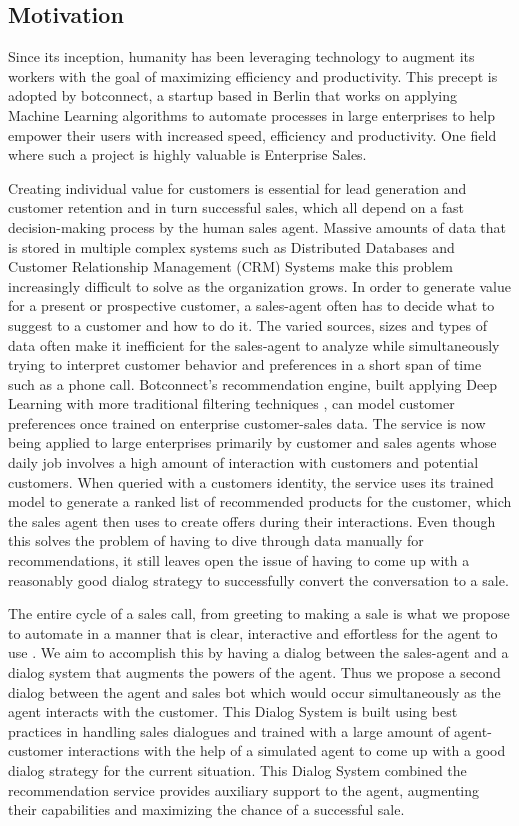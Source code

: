 \documentclass[12pt]{extarticle}
\numberwithin{equation}{section}
\begin{document}
	\subsection{Motivation}
	Since its inception, humanity has been leveraging technology to augment its workers with the goal of maximizing efficiency and productivity. This precept is adopted by botconnect, a startup based in Berlin that works on applying Machine Learning algorithms to automate processes in large enterprises to help empower their users with increased speed, efficiency and productivity. One field where such a project is highly valuable is Enterprise Sales. \par
	Creating individual value for customers is essential for lead generation and customer retention and in turn successful sales, which all depend on a fast decision-making process by the human sales agent. Massive amounts of data that is stored in multiple complex systems such as Distributed Databases and Customer Relationship Management (CRM) Systems make this problem increasingly difficult to solve as the organization grows. In order to generate value for a present or prospective customer, a sales-agent often has to decide what to suggest to a customer and how to do it. The varied sources, sizes and types of data often make it inefficient for the sales-agent to analyze while simultaneously trying to interpret customer behavior and preferences in a short span of time such as a phone call. Botconnect's recommendation engine, built applying Deep Learning with more traditional filtering techniques \cite{ncf2017}, can model customer preferences once trained on enterprise customer-sales data. The service is now being applied to large enterprises primarily by customer and sales agents whose daily job involves a high amount of interaction with customers and potential customers. \label{plag1} When queried with a customers identity, the service uses its trained model to generate a ranked list of recommended products for the customer, which the sales agent then uses to create offers during their interactions. Even though this solves the problem of having to dive through data manually for recommendations, it still leaves open the issue of having to come up with a reasonably good dialog strategy to successfully convert the conversation to a sale.\par  \label{plag10} 
	The entire cycle of a sales call, from greeting to making a sale is what we propose to automate in a manner that is clear, interactive and effortless for the agent to use \cite{frey2017future}. We aim to accomplish this by having a dialog \cite{Tao_of_CHI} between the sales-agent and a dialog system that augments the powers of the agent. Thus we propose a second dialog between the agent and sales bot which would  occur simultaneously as the agent interacts with the customer. This Dialog System is built using best practices in handling sales dialogues and trained with a large amount of agent-customer interactions with the help of a simulated agent to come up with a good dialog strategy for the current situation. This Dialog System combined the recommendation service provides auxiliary support to the agent, augmenting their capabilities and maximizing the chance of a successful sale. \par
\end{document}
